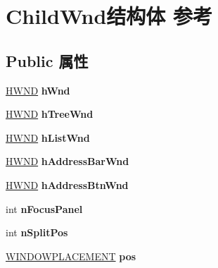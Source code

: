 \hypertarget{struct_child_wnd}{}\section{Child\+Wnd结构体 参考}
\label{struct_child_wnd}
\subsection*{Public 属性}
\begin{DoxyCompactItemize}
\item 
\mbox{\label{struct_child_wnd_afeb212271cfb97c51bf3ea1d4e53bef3}} 
\hyperlink{interfacevoid}{H\+W\+ND} {\bfseries h\+Wnd}
\item 
\mbox{\label{struct_child_wnd_a467179d936c61dafccdb6299f14053b3}} 
\hyperlink{interfacevoid}{H\+W\+ND} {\bfseries h\+Tree\+Wnd}
\item 
\mbox{\label{struct_child_wnd_ac99de0834c92f2768860e666fda4a3bf}} 
\hyperlink{interfacevoid}{H\+W\+ND} {\bfseries h\+List\+Wnd}
\item 
\mbox{\label{struct_child_wnd_ad889cfdd00c0c682503489b4128e1d3c}} 
\hyperlink{interfacevoid}{H\+W\+ND} {\bfseries h\+Address\+Bar\+Wnd}
\item 
\mbox{\label{struct_child_wnd_a1d9e35f5746af1b7ef12e481083bcb0d}} 
\hyperlink{interfacevoid}{H\+W\+ND} {\bfseries h\+Address\+Btn\+Wnd}
\item 
\mbox{\label{struct_child_wnd_a208c92d0332d7d150bfcb0b69de44222}} 
int {\bfseries n\+Focus\+Panel}
\item 
\mbox{\label{struct_child_wnd_a0d71f8c4606760e636dff71c07de455c}} 
int {\bfseries n\+Split\+Pos}
\item 
\mbox{\label{struct_child_wnd_a20f476695483d2e71ad305a793756de2}} 
\hyperlink{struct___w_i_n_d_o_w_p_l_a_c_e_m_e_n_t}{W\+I\+N\+D\+O\+W\+P\+L\+A\+C\+E\+M\+E\+NT} {\bfseries pos}
\item 
\mbox{\label{struct_child_wnd_a15e687a5cd9e8c136b995f50e8eb4e35}} 

\end{DoxyCompactItemize}
